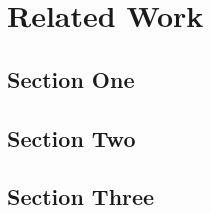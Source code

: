 \chapter{Related Work}
\label{chap:related}

\begin{chapabstract}
\end{chapabstract}



\section{Section One}
\label{sec:related-one}


\section{Section Two}
\label{sec:related-two}


\section{Section Three}
\label{sec:related-three}


